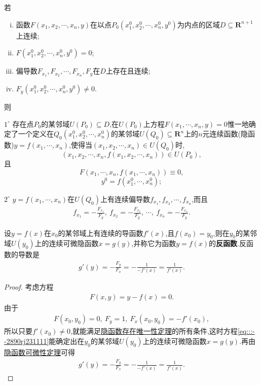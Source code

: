\documentclass[../../main.tex]{subfiles}%
\begin{document}
\begin{theorem}
若
\begin{enumerate}[(i)]
\item 函数$F(x_1,x_2,\cdots,x_n,y)$在以点$P_0(x_1^0,x_2^0,\cdots,x_n^0,y^0)$为内点的区域$D \subseteq \mathbf{R}^{n+1}$上连续;
\item $F(x_1^0,x_2^0,\cdots,x_n^0,y^0) = 0$;
\item 偏导数$F_{x_1},F_{x_2},\cdots,F_{x_n},F_y$在$D$上存在且连续;
\item $F_y(x_1^0,x_2^0,\cdots,x_n^0,y^0) \neq 0$.
\end{enumerate}
则

$1^\circ$ 存在点$P_0$的某邻域$U(P_0) \subseteq D$,在$U(P_0)$上方程$F(x_1,\cdots,x_n,y) = 0$惟一地确定了一个定义在$Q_0(x_1^0,x_2^0,\cdots,x_n^0)$的某邻域$U(Q_0) \subseteq \mathbf{R}^n$上的$n$元连续函数(隐函数)$y = f(x_1,\cdots,x_n)$,使得当$(x_1,x_2,\cdots,x_n) \in U(Q_0)$时,
\[
(x_1,x_2,\cdots,x_n,f(x_1,x_2,\cdots,x_n)) \in U(P_0),
\]
且
\[
F(x_1,\cdots,x_n,f(x_1,\cdots,x_n)) \equiv 0,
\]
\[
y^0 = f(x_1^0,\cdots,x_n^0);
\]

$2^\circ$ $y = f(x_1,\cdots,x_n)$在$U(Q_0)$上有连续偏导数$f_{x_1},f_{x_2},\cdots,f_{x_n}$,而且
\begin{align*}
f_{x_1} = -\frac{F_{x_1}}{F_y},\ f_{x_2} = -\frac{F_{x_2}}{F_y},\ \cdots,\ f_{x_n} = -\frac{F_{x_n}}{F_y}.
\end{align*}
\end{theorem}

\begin{theorem}[反函数的存在性及其导数]
设$y = f(x)$在$x_0$的某邻域上有连续的导函数$f'(x)$,且$f(x_0) = y_0$,则在$y_0$的某邻域$U(y_0)$上的连续可微隐函数$x = g(y)$,并称它为函数$y = f(x)$的\textbf{反函数}.反函数的导数是
\begin{align*}
g'(y) = -\frac{F_y}{F_x} = -\frac{1}{-f'(x)} = \frac{1}{f'(x)}. 
\end{align*}
\end{theorem}
\begin{proof}

考虑方程
\begin{align}
F(x,y) = y - f(x) = 0. \label{eq:::--2890rj231111}
\end{align}
由于
\begin{align*}
F(x_0,y_0) = 0,\ F_y = 1,\ F_x(x_0,y_0) = -f'(x_0),
\end{align*}
所以只要$f'(x_0) \neq 0$,就能满足\hyperref[theorem:隐函数存在唯一性定理]{隐函数存在唯一性定理}的所有条件,这时方程\eqref{eq:::--2890rj231111}能确定出在$y_0$的某邻域$U(y_0)$上的连续可微隐函数$x = g(y)$.再由\hyperref[theorem:隐函数可微性定理]{隐函数可微性定理}可得
\begin{align*}
g'(y) = -\frac{F_y}{F_x} = -\frac{1}{-f'(x)} = \frac{1}{f'(x)}. 
\end{align*}

\end{proof}
\end{document}
